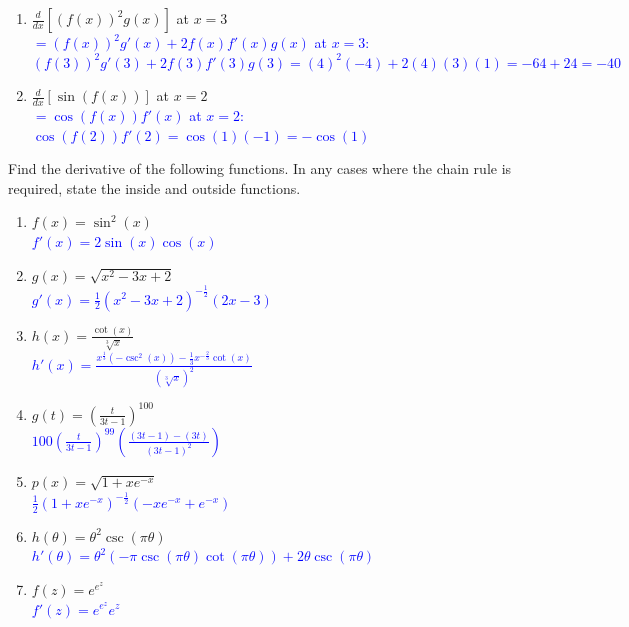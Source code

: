 \documentclass{ximera}
\begin{document}
\begin{exercise}
\begin{enumerate}
        \item[f.] $\frac{d}{dx}[(f(x))^2g(x)]$ at $x=3$\\
        \textcolor{blue}{ $=(f(x))^2g'(x)+2f(x)f'(x)g(x)$ at $x=3$: \\$(f(3))^2g'(3)+2f(3)f'(3)g(3)=(4)^2(-4)+2(4)(3)(1)=-64+24=-40$}

        \item $\frac{d}{dx}[\sin(f(x))]$ at $x=2$\\
        \textcolor{blue}{$=\cos(f(x))f'(x)$ at $x=2$: $\cos(f(2))f'(2)=\cos(1)(-1)=-\cos(1)$}
    \end{enumerate}
\end{exercise}

\begin{exercise}
Find the derivative of the following functions.  In any cases where the chain rule is required, state the inside and outside functions.
    \begin{enumerate}
        \item $\displaystyle f(x)=\sin^2(x)$ \\
        \textcolor{blue}{ $f'(x)=2\sin(x)\cos(x)$}

        \item $g(x)=\sqrt{x^2-3x+2}$ \\
        \textcolor{blue}{ $g'(x)=\frac12(x^2-3x+2)^{-\frac12}(2x-3)$}

        \item $\displaystyle h(x)=\frac{\cot(x)}{\sqrt[3]{x}}$\\
        \textcolor{blue}{ $h'(x)=\frac{x^{\frac13}(-\csc^2(x))-\frac13x^{-\frac23}\cot(x)}{(\sqrt[3]{x})^2}$}

        \item $g(t)=(\frac{t}{3t-1})^{100}$\\
        \textcolor{blue}{$100(\frac{t}{3t-1})^{99}(\frac{(3t-1)-(3t)}{(3t-1)^2})$}
        
        \item $p(x)=\sqrt{1+xe^{-x}}$\\
        \textcolor{blue}{$\frac{1}{2}(1+xe^{-x})^{-\frac12}(-xe^{-x}+e^{-x})$}
        
        \item $\displaystyle h(\theta)=\theta^2\csc(\pi\theta)$\\
        \textcolor{blue}{ $h'(\theta)=\theta^2(-\pi\csc(\pi\theta)\cot(\pi\theta))+2\theta\csc(\pi\theta)$}

        \item $f(z)=e^{e^z}$\\
        \textcolor{blue}{ $f'(z)=e^{e^z}e^z$}
        
    \end{enumerate}

\end{exercise}
\end{document}
